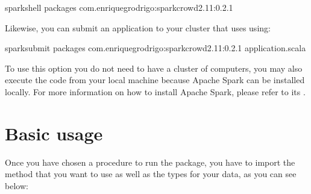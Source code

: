 \documentclass[letterpaper,10pt,english]{sphinxmanual}
\begin{document}
%
\begin{sphinxVerbatim}[commandchars=\\\{\}]
spark\PYGZhy{}shell \PYGZhy{}\PYGZhy{}packages com.enriquegrodrigo:spark\PYGZhy{}crowd\PYGZus{}2.11:0.2.1
\end{sphinxVerbatim}

Likewise, you can submit an application to your cluster that uses  using:

%
\begin{sphinxVerbatim}[commandchars=\\\{\}]
spark\PYGZhy{}submit \PYGZhy{}\PYGZhy{}packages com.enriquegrodrigo:spark\PYGZhy{}crowd\PYGZus{}2.11:0.2.1 application.scala
\end{sphinxVerbatim}

To use this option you do not need to have a cluster of computers, you may also execute the code from
your local machine because Apache Spark can be installed locally. For more information on how to install
Apache Spark, please refer to its . 


\section{Basic usage}
\label{\detokenize{usage/quickstart:basic-usage}}
Once you have chosen a procedure to run the package, you have to import the method
that you want to use as well as the types for your data, as you can see below:

%
\begin{sphinxVerbatim}[commandchars=\\\{\}]
 
 

   

   \PYG{o}{[}\PYG{o}{]}

   

   \PYG{o}{[}\PYG{o}{]}

   
\end{sphinxVerbatim}
\end{document}
